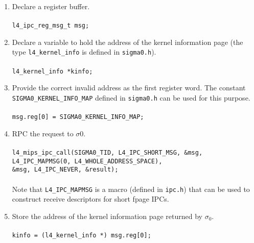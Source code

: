 \begin{enumerate}

\item Declare a register buffer. \\ \\
  \hspace*{10pt} {\footnotesize\verb+l4_ipc_reg_msg_t msg;+}

\item Declare a variable to hold the address of the kernel
  information page (the type {\footnotesize\verb+l4_kernel_info+} is defined in
  {\footnotesize\verb+sigma0.h+}). \\ \\
  \hspace*{10pt} {\footnotesize\verb+l4_kernel_info *kinfo;+}
  
\item Provide the correct invalid address as the first register word.
  The constant {\footnotesize\verb+SIGMA0_KERNEL_INFO_MAP+} defined in {\footnotesize\verb+sigma0.h+}
  can be used for this purpose.
  \\ \\  \hspace*{10pt} {\footnotesize\verb+msg.reg[0] = SIGMA0_KERNEL_INFO_MAP;+} \\
  
\item RPC the request to $\sigma0$. \\ \\
  \hspace*{20pt} {\footnotesize\verb+l4_mips_ipc_call(SIGMA0_TID, L4_IPC_SHORT_MSG, &msg,+}\\
  \hspace*{110pt} {\footnotesize\verb+L4_IPC_MAPMSG(0, L4_WHOLE_ADDRESS_SPACE),+}\\
  \hspace*{110pt} {\footnotesize\verb+&msg, L4_IPC_NEVER, &result);+} \\ \\
  Note that {\footnotesize\verb+L4_IPC_MAPMSG+} is a macro (defined in {\footnotesize\verb+ipc.h+})
  that can be used to construct receive descriptors for short fpage IPCs.
  
\item Store the address of the kernel information page returned by
  $\sigma_0$. \\ \\
  \hspace*{20pt} {\footnotesize\verb+kinfo = (l4_kernel_info *) msg.reg[0];+}

\end{enumerate}


